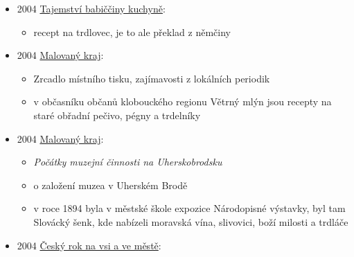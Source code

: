 \begin{itemize}
  \begin{itemize}
  \tightlist
  \item
    s. 58: 

    \begin{itemize}
    \tightlist
    \item
      Trdelníčky Hradec Králové
    \item
      kynuté těsto
    \item
      obalujou před pečením v perníku, čokoládě, fících, cukru a dalším
      sušeným ovoci
    \item
      posypaný těsto lehounce přejedeme válečkem a krájíme na pruhy 2 cm
      široké, pečem na plechových trubičkách
    \end{itemize}
  \end{itemize}
\item
  2004
  \href{https://ceskadigitalniknihovna.cz/uuid/uuid:b5a5b2c0-dc5e-11e5-984e-005056827e52}{Tajemství
  babiččiny kuchyně}:

  \begin{itemize}
  \tightlist
  \item
    recept na trdlovec, je to ale překlad z němčiny
  \end{itemize}
\item
  2004
  \href{https://ndk.cz/uuid/uuid:a3d631b0-ee43-11e3-8e46-5ef3fc9ae867}{Malovaný
  kraj}:

  \begin{itemize}
  \tightlist
  \item
    Zrcadlo místního tisku, zajímavosti z lokálních periodik
  \item
    v občasníku občanů klobouckého regionu Větrný mlýn jsou recepty na
    staré obřadní pečivo, pégny a trdelníky
  \end{itemize}
\item
  2004
  \href{https://ndk.cz/uuid/uuid:a7cdbfc0-ee45-11e3-8e46-5ef3fc9ae867}{Malovaný
  kraj}:

  \begin{itemize}
  \tightlist
  \item
     \emph{Počátky muzejní činnosti na
    Uherskobrodsku}
  \item
    o založení muzea v Uherském Brodě
  \item
    v roce 1894 byla v městské škole expozice Národopisné výstavky, byl
    tam Slovácký šenk, kde nabízeli moravská vína, slivovici, boží
    milosti a trdláče
  \end{itemize}
\item
  2004
  \href{https://www.digitalniknihovna.cz/mzk/uuid/uuid:8107dfd0-4d78-11e6-a5c5-005056827e51}{Český
  rok na vsi a ve městě}:


\end{itemize}
